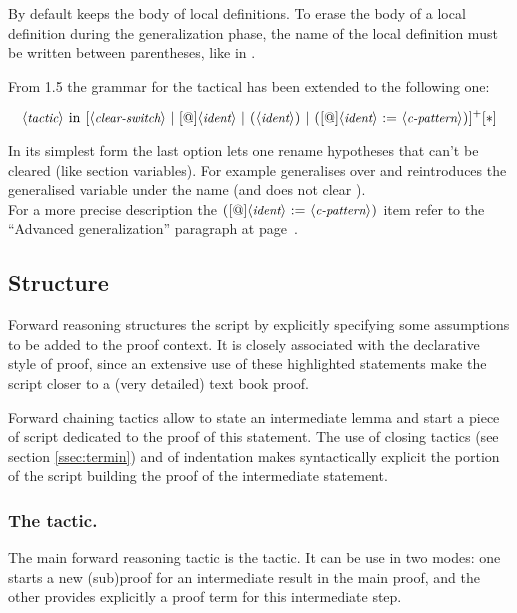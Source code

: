 By default  keeps the body of local definitions. To erase
the body of a local definition during the generalization phase, 
the name of the local definition must be written between parentheses, 
like in .

From \ssr{} 1.5 the grammar for the  tactical has been extended
to the following one:

$$\N{tactic}\ \C{in}\ [ \N{clear-switch}\ |\ 
                        [\C{@}]\N{ident}\ |\ 
                        \C{(}\N{ident}\C{)}\ |\ 
                        \C{(}[\C{@}]\N{ident}\ \C{:=}\ \N{c-pattern}\C{)} 
                      ]^+ [\C{*}]$$

In its simplest form the last option lets one rename hypotheses that can't be
cleared (like section variables).  For example  generalises
over  and reintroduces the generalised
variable under the name \C{y} (and does not clear \C{x}).\\
For a more precise description the $\C{(}[\C{@}]\N{ident}\ \C{:=}\ \N{c-pattern}\C{)}$
item refer to the ``Advanced generalization'' paragraph at page~\pageref{par:advancedgen}.

\subsection{Structure}\label{ssec:struct}

Forward reasoning structures the script by explicitly specifying some
assumptions to be added to the proof context. It is closely associated
with the declarative style of proof, since an extensive use of these
highlighted statements
make the script closer to a (very detailed) text book proof.

Forward chaining tactics allow to state an intermediate lemma and start a
piece of script dedicated to the proof of this statement. The use of
closing tactics (see section \ref{ssec:termin}) and of
indentation makes syntactically explicit the portion of the script
building the proof of the intermediate statement.

\subsubsection*{The \C{have} tactic.}
\label{sssec:have}

The main \ssr{} forward reasoning tactic is the  tactic. It
can be use in two modes: one starts a new (sub)proof for an
intermediate result in the main proof, and the other
provides explicitly a proof term for this intermediate step.

